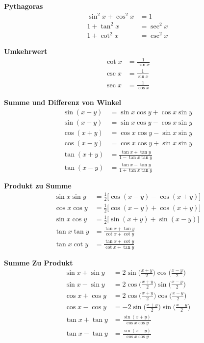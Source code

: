 \begin{multicols}{2}
  \textbf{Pythagoras}
  \begin{align*}
    \sin^2 x + \cos^2 x & = 1        \\
    1 + \tan^2 x        & = \sec^2 x \\
    1 + \cot^2 x        & = \csc^2 x
  \end{align*}

  \textbf{Umkehrwert}
  \begin{align*}
    \cot x & = \frac{1}{\tan x} \\
    \csc x & = \frac{1}{\sin x} \\
    \sec x & = \frac{1}{\cos x}
  \end{align*}

  \textbf{Summe und Differenz von Winkel}
  \begin{align*}
    \sin(x + y) & = \sin x \cos y + \cos x \sin y             \\
    \sin(x - y) & = \sin x \cos y - \cos x \sin y             \\
    \cos(x + y) & = \cos x \cos y - \sin x \sin y             \\
    \cos(x - y) & = \cos x \cos y + \sin x \sin y             \\
    \tan(x + y) & = \frac{\tan x + \tan y}{1 - \tan x \tan y} \\
    \tan(x - y) & = \frac{\tan x - \tan y}{1 + \tan x \tan y}
  \end{align*}

  \textbf{Produkt zu Summe}
  \begin{align*}
    \sin x \sin y & = \frac{1}{2}\big[\cos(x - y) - \cos(x + y)\big] \\
    \cos x \cos y & = \frac{1}{2}\big[\cos(x - y) + \cos(x + y)\big] \\
    \sin x \cos y & = \frac{1}{2}\big[\sin(x + y) + \sin(x - y)\big] \\
    \tan x \tan y & = \frac{ \tan x + \tan y }{ \cot x + \cot y }    \\
    \tan x \cot y & = \frac{ \tan x + \cot y }{ \cot x + \tan y }
  \end{align*}

  \textbf{Summe Zu Produkt}
  \begin{align*}
    \sin x + \sin y & = 2 \sin \Big( \frac{x + y}{2} \Big) \cos \Big( \frac{x - y}{2} \Big)  \\
    \sin x - \sin y & = 2 \cos \Big( \frac{x + y}{2} \Big) \sin \Big( \frac{x - y}{2} \Big)  \\
    \cos x + \cos y & = 2 \cos \Big( \frac{x + y}{2} \Big) \cos \Big( \frac{x - y}{2} \Big)  \\
    \cos x - \cos y & = -2 \sin \Big( \frac{x + y}{2} \Big) \sin \Big( \frac{x - y}{2} \Big) \\
    \tan x + \tan y & = \frac{ \sin(x + y) }{ \cos x \cos y}                                 \\
    \tan x - \tan y & = \frac{ \sin(x - y) }{ \cos x \cos y}                                 \\
  \end{align*}

\end{multicols}
